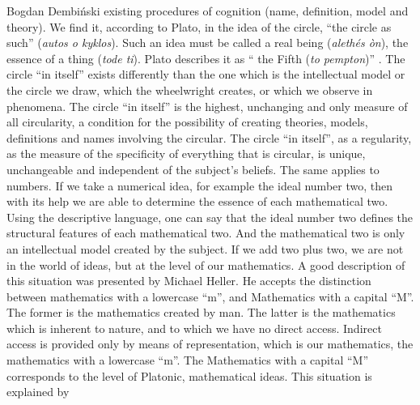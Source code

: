 \begin{artengenv}{Bogdan Dembiński}
existing procedures of cognition (name, definition, model and theory). We find it, according to Plato, in%
 the idea of the circle, ``the circle as such'' (\textit{autos o kyklos}). Such an idea must be called a real being
(\textit{alethés òn}), the essence of a thing (\textit{tode ti}). Plato describes it as ``%
the Fifth (\textit{to pempton})''
\parencite[\textit{Letters}, 342a-343d]{plato_platonis_1955}.
The circle ``in itself''
exists differently than the one which is the intellectual model or the circle we draw, which the wheelwright creates,
or which we observe in phenomena. The circle ``in itself'' is the highest, unchanging and only measure of all
circularity, a condition for the possibility of creating theories, models, definitions and names %
involving the circular. The circle ``in itself'', as a regularity, as the measure of the specificity of everything that is
circular, is unique, unchangeable and independent of the subject’s %
beliefs.%
 The same applies to numbers. If we take a numerical idea, for example the ideal number two, then with its help we are
able to determine the essence of each mathematical two. Using the descriptive language, one can say that the ideal
number two defines the structural features of each mathematical two. And the mathematical two is only an intellectual
model created by the subject. If we add two plus two, we are not in the world of ideas, but at the level of our
mathematics. A good description of this situation was presented by Michael Heller. He accepts the distinction between
mathematics with a lowercase ``m'', and Mathematics with a capital ``M''. The former is the mathematics created by man. The
latter is the mathematics which is inherent to nature, and to which we have no direct access. Indirect access is
provided only by means of representation, which is our mathematics, the mathematics with a lowercase ``m''. The
Mathematics with a capital ``M'' corresponds to the level of Platonic, mathematical ideas. This situation is explained by

\end{artengenv}
